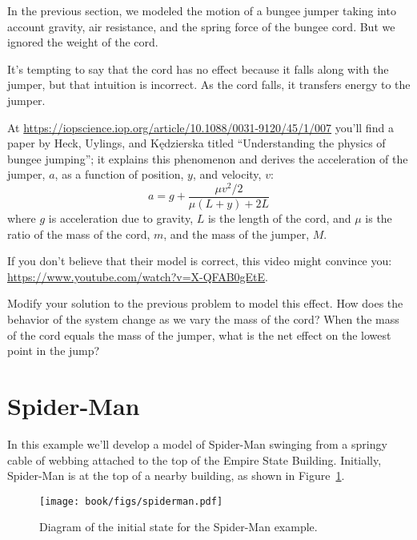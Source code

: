 
In the previous section, we modeled the motion of a bungee jumper taking into account gravity, air resistance, and the spring force of the bungee cord.  But we ignored the weight of the cord.


It's tempting to say that the cord has no effect because it falls along with the jumper, but that intuition is incorrect.  As the cord falls, it transfers energy to the jumper.


At \url{https://iopscience.iop.org/article/10.1088/0031-9120/45/1/007} you'll find a paper by Heck, Uylings, and Kędzierska titled ``Understanding the physics of bungee jumping''; it explains this phenomenon and derives the acceleration of the jumper, $a$, as a function of position, $y$, and velocity, $v$:
%
\[ a = g + \frac{\mu v^2/2}{\mu(L+y) + 2L} \] 
%
where $g$ is acceleration due to gravity, $L$ is the length of the cord, and $\mu$ is the ratio of the mass of the cord, $m$, and the mass of the jumper, $M$.

If you don't believe that their model is correct, this video might convince you: \url{https://www.youtube.com/watch?v=X-QFAB0gEtE}.

\begin{ex}

Modify your solution to the previous problem to model this effect.  How does the behavior of the system change as we vary the mass of the cord?  When the mass of the cord equals the mass of the jumper, what is the net effect on the lowest point in the jump?

\end{ex}


\section{Spider-Man}

In this example we'll develop a model of Spider-Man swinging from a
springy cable of webbing attached to the top of the Empire State
Building.  Initially, Spider-Man is at the top of a nearby building, as
shown in Figure~\ref{spiderman}.


\begin{figure}
\centerline{\texttt{[image: book/figs/spiderman.pdf]}}
\caption{Diagram of the initial state for the Spider-Man example.}
\label{spiderman}
\end{figure}

